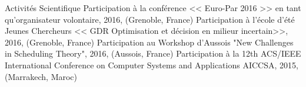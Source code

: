\begin{rubric}{Activités Scientifique}
\entry*[]	Participation à la conférence << Euro-Par 2016 >> en tant qu'organisateur volontaire, 2016, (Grenoble, France) 
\entry*[]	Participation à l'école d'été Jeunes Chercheurs << GDR Optimisation et décision en milieur incertain>>, 2016, (Grenoble, France)	
\entry*[]	Participation au Workshop d'Aussois "New Challenges in Scheduling Theory", 2016, (Aussois, France)	
\entry*[]	Participation à la 12th ACS/IEEE International Conference on Computer Systems and Applications AICCSA, 2015, (Marrakech, Maroc) 	
\end{rubric}
